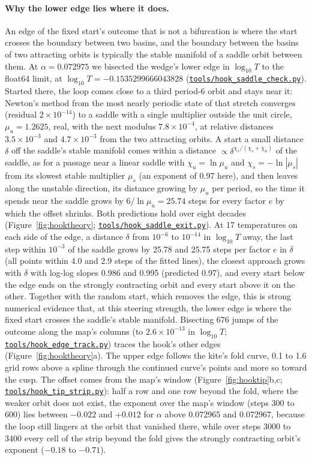 \documentclass[11pt,letterpaper]{article}
\newcommand{\repourl}{https://github.com/tdj28/neural-shrimp}
\newcommand{\reporef}{arxiv-v1}
\newcommand{\repo}[1]{\href{\repourl/blob/\reporef/#1}{\nolinkurl{#1}}}
\begin{document}
\paragraph{Why the lower edge lies where it does.} An edge of the fixed start's outcome that is not a bifurcation is
where the start crosses the boundary between two basins, and the boundary between the basins of two attracting orbits
is typically the stable manifold of a saddle orbit between them. At $\alpha=0.072975$ we bisected the wedge's lower
edge in $\log_{10}T$ to the float64 limit, at $\log_{10}T=-0.1535299666043828$ (\repo{tools/hook_saddle_check.py}).
Started there, the loop comes close to a third period-6 orbit and stays near it: Newton's method from the most nearly
periodic state of that stretch converges (residual $2\times10^{-14}$) to a saddle with a single multiplier outside the
unit circle, $\mu_u=1.2625$, real, with the next modulus $7.8\times10^{-4}$, at relative distances
$3.5\times10^{-3}$ and $4.7\times10^{-3}$ from the two attracting orbits. A start a small distance $\delta$ off the saddle's
stable manifold comes within a distance $\propto\delta^{\chi_s/(\chi_s+\chi_u)}$ of the saddle, as for a passage near
a linear saddle with $\chi_u=\ln\mu_u$ and $\chi_s=-\ln|\mu_s|$ from its slowest stable multiplier $\mu_s$ (an
exponent of 0.97 here), and then leaves along the unstable direction, its distance growing by $\mu_u$ per period, so the time it spends near the saddle grows by
$6/\ln\mu_u=25.74$ steps for every factor $e$ by which the offset shrinks. Both predictions hold over eight decades
(Figure~\ref{fig:hooktheory}; \repo{tools/hook_saddle_exit.py}). At 17 temperatures on each side of the edge, a
distance $\delta$ from $10^{-6}$ to $10^{-14}$ in $\log_{10}T$ away, the last step within $10^{-3}$ of the saddle
grows by 25.78 and 25.75 steps per factor $e$ in $\delta$ (all points within 4.0 and 2.9 steps of the fitted lines),
the closest approach grows with $\delta$ with log-log slopes 0.986 and 0.995 (predicted 0.97), and every start below the edge ends on
the strongly contracting orbit and every start above it on the other. Together with the random start, which removes
the edge, this is strong numerical evidence that, at this steering strength, the lower edge is where the fixed start
crosses the saddle's stable manifold. Bisecting 676
jumps of the outcome along the map's columns (to $2.6\times10^{-13}$ in $\log_{10}T$; \repo{tools/hook_edge_track.py})
traces the hook's other edges (Figure~\ref{fig:hooktheory}a). The upper edge follows the kite's fold curve, 0.1 to
1.6 grid rows above a spline through the continued curve's points and more so toward the cusp. The offset comes from
the map's window (Figure~\ref{fig:hooktip}b,c; \repo{tools/hook_tip_strip.py}): half a row and one row beyond the fold,
where the weaker orbit does not exist, the exponent over the map's window (steps 300 to 600) lies between $-0.022$ and
$+0.012$ for $\alpha$ above 0.072965 and 0.072967, because the loop still lingers at the orbit that vanished there,
while over steps 3000 to 3400 every cell of the strip beyond the fold gives the strongly contracting orbit's exponent ($-0.18$ to
$-0.71$).
\end{document}
